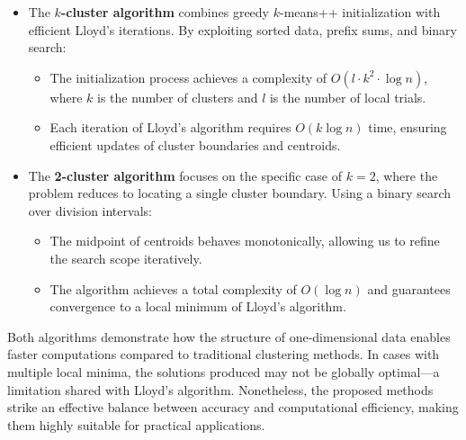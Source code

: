 \begin{itemize}
    \item The \textbf{\(k\)-cluster algorithm} combines greedy $k$-means++ initialization with efficient Lloyd’s iterations. By exploiting sorted data, prefix sums, and binary search:
        \begin{itemize}
            \item The initialization process achieves a complexity of \(O(l \cdot k^2 \cdot \log n)\), where \(k\) is the number of clusters and \(l\) is the number of local trials.
            \item Each iteration of Lloyd’s algorithm requires \(O(k \log n)\) time, ensuring efficient updates of cluster boundaries and centroids.
        \end{itemize}

    \item The \textbf{2-cluster algorithm} focuses on the specific case of \(k=2\), where the problem reduces to locating a single cluster boundary. Using a binary search over division intervals:
        \begin{itemize}
            \item The midpoint of centroids behaves monotonically, allowing us to refine the search scope iteratively.
            \item The algorithm achieves a total complexity of \(O(\log n)\) and guarantees convergence to a local minimum of Lloyd's algorithm.
        \end{itemize}
\end{itemize}

Both algorithms demonstrate how the structure of one-dimensional data enables faster computations compared to traditional clustering methods. In cases with multiple local minima, the solutions produced may not be globally optimal---a limitation shared with Lloyd's algorithm. Nonetheless, the proposed methods strike an effective balance between accuracy and computational efficiency, making them highly suitable for practical applications.
